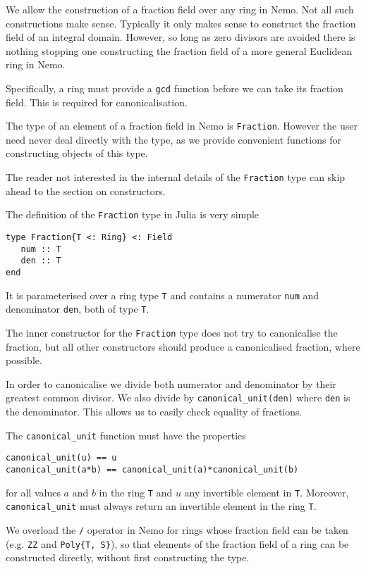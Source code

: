\documentclass[a4paper,10pt]{article}
\newcommand{\code}{\lstinline}
\begin{document}
{{{We allow the construction of a fraction field over any ring in Nemo. Not all
such constructions make sense. Typically it only makes sense to construct the
fraction field of an integral domain. However, so long as zero divisors are
avoided there is nothing stopping one constructing the fraction field of a
more general Euclidean ring in Nemo.

Specifically, a ring must provide a \code{gcd} function before we can take its
fraction field. This is required for canonicalisation.

The type of an element of a fraction field in Nemo is \code{Fraction}. However
the user need never deal directly with the type, as we provide convenient
functions for constructing objects of this type.

The reader not interested in the internal details of the \code{Fraction} type
can skip ahead to the section on constructors.

The definition of the \code{Fraction} type in Julia is very simple

\begin{lstlisting}
type Fraction{T <: Ring} <: Field
   num :: T
   den :: T
end
\end{lstlisting}

It is parameterised over a ring type \code{T} and contains a numerator 
\code{num} and denominator \code{den}, both of type \code{T}.

The inner constructor for the \code{Fraction} type does not try to canonicalise
the fraction, but all other constructors should produce a canonicalised
fraction, where possible.

In order to canonicalise we divide both numerator and denominator by their
greatest common divisor. We also divide by \code{canonical_unit(den)} where
\code{den} is the denominator. This allows us to easily check equality of
fractions.

The \code{canonical_unit} function must have the properties

\begin{lstlisting}
canonical_unit(u) == u
canonical_unit(a*b) == canonical_unit(a)*canonical_unit(b)
\end{lstlisting}

for all values $a$ and $b$ in the ring \code{T} and $u$ any invertible element
in \code{T}. Moreover, \code{canonical_unit} must always return an invertible
element in the ring \code{T}.

We overload the \code{/} operator in Nemo for rings whose fraction field can
be taken (e.g. \code{ZZ} and \code|Poly{T, S}|), so that elements of the
fraction field of a ring can be constructed directly, without first
constructing the type.

}}}
\end{document}

